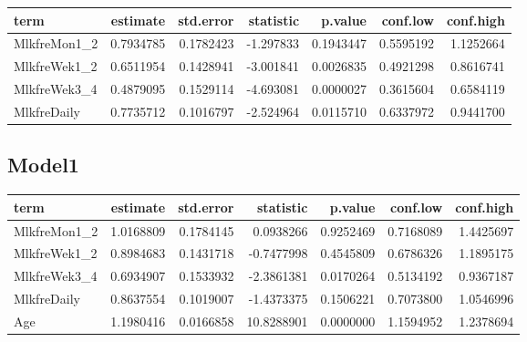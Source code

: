 \documentclass[
]{article}
\newenvironment{Shaded}{\begin{snugshade}}{\end{snugshade}}
\newcommand{\DataTypeTok}[1]{\textcolor[rgb]{0.13,0.29,0.53}{#1}}
\newcommand{\KeywordTok}[1]{\textcolor[rgb]{0.13,0.29,0.53}{\textbf{#1}}}
\newcommand{\NormalTok}[1]{#1}
\newcommand{\OperatorTok}[1]{\textcolor[rgb]{0.81,0.36,0.00}{\textbf{#1}}}
\newcommand{\OtherTok}[1]{\textcolor[rgb]{0.56,0.35,0.01}{#1}}
\newcommand{\StringTok}[1]{\textcolor[rgb]{0.31,0.60,0.02}{#1}}
\begin{document}
\begin{longtable}[]{@{}lrrrrrr@{}}
\toprule
term & estimate & std.error & statistic & p.value & conf.low &
conf.high\tabularnewline
\midrule
\endhead
MlkfreMon1\_2 & 0.7934785 & 0.1782423 & -1.297833 & 0.1943447 &
0.5595192 & 1.1252664\tabularnewline
MlkfreWek1\_2 & 0.6511954 & 0.1428941 & -3.001841 & 0.0026835 &
0.4921298 & 0.8616741\tabularnewline
MlkfreWek3\_4 & 0.4879095 & 0.1529114 & -4.693081 & 0.0000027 &
0.3615604 & 0.6584119\tabularnewline
MlkfreDaily & 0.7735712 & 0.1016797 & -2.524964 & 0.0115710 & 0.6337972
& 0.9441700\tabularnewline
\bottomrule
\end{longtable}

\hypertarget{model1-10}{%
\subsection{Model1}\label{model1-10}}

\begin{Shaded}
\end{Shaded}

\begin{longtable}[]{@{}lrrrrrr@{}}
\toprule
term & estimate & std.error & statistic & p.value & conf.low &
conf.high\tabularnewline
\midrule
\endhead
MlkfreMon1\_2 & 1.0168809 & 0.1784145 & 0.0938266 & 0.9252469 &
0.7168089 & 1.4425697\tabularnewline
MlkfreWek1\_2 & 0.8984683 & 0.1431718 & -0.7477998 & 0.4545809 &
0.6786326 & 1.1895175\tabularnewline
MlkfreWek3\_4 & 0.6934907 & 0.1533932 & -2.3861381 & 0.0170264 &
0.5134192 & 0.9367187\tabularnewline
MlkfreDaily & 0.8637554 & 0.1019007 & -1.4373375 & 0.1506221 & 0.7073800
& 1.0546996\tabularnewline
Age & 1.1980416 & 0.0166858 & 10.8288901 & 0.0000000 & 1.1594952 &
1.2378694\tabularnewline
\bottomrule
\end{longtable}
\end{document}
